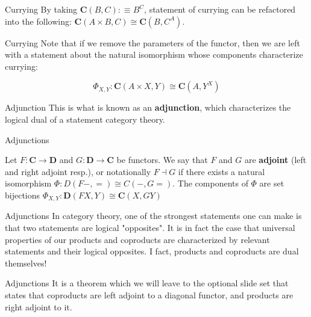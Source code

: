 \documentclass[tikz]{beamer}
\theoremstyle{definition}
\newcommand{\cat}[1]{\mathbf{#1}}
\begin{document}
\begin{frame}{Currying}
   By taking $\cat{C}(B, C) :\equiv B^C$, statement of currying can  be refactored into the following: $\cat{C}(A \times B, C) \cong \cat{C}(B, C^A)$.
\end{frame}

\begin{frame}{Currying}
   Note that if we remove the parameters of the functor, then we are left with a statement about the natural isomorphism whose components characterize currying:

   \begin{center}
   	\begin{equation*}
		\Phi_{X,Y} : \cat{C}(A \times X, Y) \cong \cat{C}(A, Y^X)
	\end{equation*}
   \end{center}
\end{frame}

\begin{frame}{Adjunction}
   This is what is known as an \textbf{adjunction}, which characterizes the logical dual of a statement category theory.
\end{frame}

\begin{frame}{Adjunctions}
   \begin{definition}[Adjunction]
   	Let $F: \cat{C} \to \cat{D}$ and $G: \cat{D} \to \cat{C}$ be functors. We say that $F$ and $G$ are \textbf{adjoint} (left and right adjoint resp.), or notationally $F \dashv G$ if there exists a natural isomorphism $\Phi : D(F-,=) \cong C(-, G=)$. The components of $\Phi$ are set bijections $\Phi_{X,Y} : \cat{D}(FX, Y) \cong \cat{C}(X, GY)$
   \end{definition}
\end{frame}

\begin{frame}{Adjunctions}
   In category theory, one of the strongest statements one can make is that two statements are logical "opposites". It is in fact the case that universal properties of our products and coproducts are characterized by relevant statements and their logical opposites. I fact, products and coproducts are dual themselves!
\end{frame}

\begin{frame}{Adjunctions}
   It is a theorem which we will leave to the optional slide set that states that coproducts are left adjoint to a diagonal functor, and products are right adjoint to it.
\end{frame}
\end{document}
